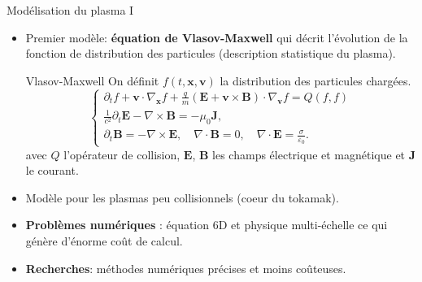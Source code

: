 \begin{frame}{Mod\'elisation du plasma I}
  \small
  \begin{itemize}
\item Premier mod\`ele: \textbf{\'equation de Vlasov-Maxwell} qui d\'ecrit l'\'evolution de la fonction de distribution des particules (description statistique du plasma).
\begin{block}{Vlasov-Maxwell}
On d\'efinit $f(t,\mathbf{x},\mathbf{v})$ la distribution  des particules charg\'ees. 
$$
\left\{\begin{array}{l}
\partial_t f +\mathbf{v}\cdot\nabla_{\mathbf{x}} f+ \frac{q}{m}\left(\mathbf{E}+\mathbf{v}\times\mathbf{B}\right)\cdot\nabla_{\mathbf{v}} f= Q(f,f)\\
 \frac{1}{c^2}\partial_t \mathbf{E}-\nabla \times \mathbf{B}= -\mu_0\mathbf{J},\\
\partial_t \mathbf{B}=-\nabla \times \mathbf{E},\quad \nabla \cdot\mathbf{B}=0,\quad \nabla \cdot \mathbf{E} =\frac{\sigma}{\varepsilon_0}.
\end{array}\right.
$$
avec $Q$ l'op\'erateur de collision, $\mathbf{E}$, $\mathbf{B}$ les champs \'electrique et magn\'etique et $\mathbf{J}$ le courant.
\end{block}
\item Mod\`ele  pour les plasmas peu collisionnels (coeur du tokamak).
\item \textbf{Probl\`emes num\'eriques} :  \'equation 6D et physique multi-\'echelle ce qui g\'en\`ere  d'\'enorme co\^{u}t de calcul.
\item \textbf{Recherches}: m\'ethodes num\'eriques pr\'ecises et moins co\^{u}teuses.
\end{itemize}
\end{frame}

